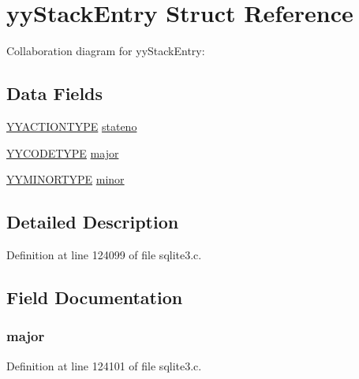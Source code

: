 \hypertarget{structyy_stack_entry}{}\section{yy\+Stack\+Entry Struct Reference}
\label{structyy_stack_entry}


Collaboration diagram for yy\+Stack\+Entry\+:
\subsection*{Data Fields}
\begin{DoxyCompactItemize}
\item 
\hyperlink{sqlite3_8c_a55d614396573a00ff0567ea215ad023c}{Y\+Y\+A\+C\+T\+I\+O\+N\+T\+Y\+P\+E} \hyperlink{structyy_stack_entry_a29bdc76b71291cde3297dfbf76dc0ab6}{stateno}
\item 
\hyperlink{sqlite3_8c_a17940350736cfe265cebeb0472fdbbed}{Y\+Y\+C\+O\+D\+E\+T\+Y\+P\+E} \hyperlink{structyy_stack_entry_aa6e509523c026d82f666907dae4e409e}{major}
\item 
\hyperlink{union_y_y_m_i_n_o_r_t_y_p_e}{Y\+Y\+M\+I\+N\+O\+R\+T\+Y\+P\+E} \hyperlink{structyy_stack_entry_ae9380fcd3ab9ffa6c6624cba73807585}{minor}
\end{DoxyCompactItemize}


\subsection{Detailed Description}


Definition at line 124099 of file sqlite3.\+c.



\subsection{Field Documentation}
\hypertarget{structyy_stack_entry_aa6e509523c026d82f666907dae4e409e}{}
\subsubsection[{major}]{ major}\label{structyy_stack_entry_aa6e509523c026d82f666907dae4e409e}


Definition at line 124101 of file sqlite3.\+c.



